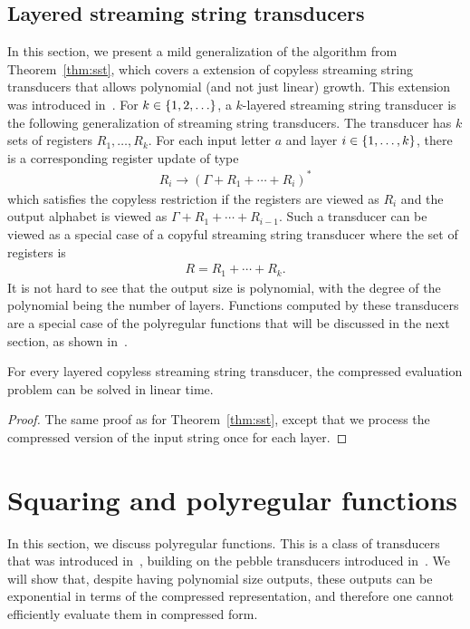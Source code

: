 \documentclass{article}
\begin{document}
\subsection{Layered streaming string transducers}
In this section, we present a mild generalization of the algorithm from Theorem~\ref{thm:sst}, which covers a extension of copyless streaming string transducers that allows polynomial (and not just linear) growth. This extension was introduced in~\cite{douneautabot_et_al:LIPIcs:2020:12697}. For $k \in \{1,2,\ldots\}$, 
a $k$-layered streaming string transducer is the following generalization of streaming string transducers. The transducer has $k$ sets of registers $R_1,\ldots,R_k$.
For each input letter $a$ and layer  $i \in \{1,\ldots,k\}$, there is a corresponding register update of type
\begin{align*}
R_i \to (\Gamma + R_1 + \cdots + R_i)^*
\end{align*}
which satisfies the copyless restriction if the registers are viewed as $R_i$ and the output  alphabet is viewed as $\Gamma + R_1 + \cdots + R_{i-1}$. Such a transducer can be viewed as a special case of a copyful streaming string transducer where the set of registers is 
\begin{align*}
R = R_1 + \cdots + R_k.
\end{align*}
It is not hard to see that the output size is polynomial, with the degree of the polynomial being the number of layers. Functions computed by these transducers are a special case of the polyregular functions that will be discussed in the next section, as shown in~\cite[Theorem 20]{douneautabot_et_al:LIPIcs:2020:12697}.

\begin{theorem}\label{thm:sst-layered} For every layered copyless streaming string transducer, the compressed evaluation problem can be solved in linear time.
\end{theorem}
\begin{proof}
    The same proof as for Theorem~\ref{thm:sst}, except that we process the compressed version of the input string once for each layer. 
\end{proof}

\section{Squaring and polyregular functions}
In this section, we discuss polyregular functions. This is a class of transducers that was introduced in~\cite{bojanczykPolyregularFunctions2018}, building on the pebble transducers introduced in~\cite{milo2000typechecking,engelfriet2002two}. We will show that, despite having polynomial size outputs, these outputs can be exponential in terms of the compressed representation, and therefore one cannot efficiently evaluate them in compressed form. 
\end{document}

